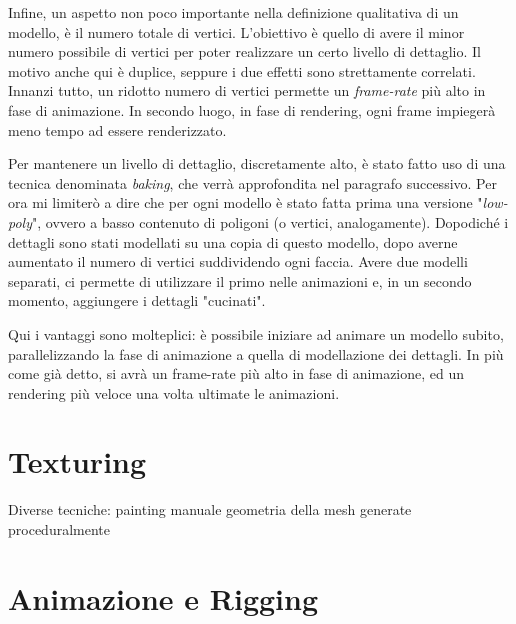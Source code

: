 Infine, un aspetto non poco importante nella definizione qualitativa di un modello, è il numero totale di vertici.
L'obiettivo è quello di avere il minor numero possibile di vertici per poter realizzare un certo livello di dettaglio.
Il motivo anche qui è duplice, seppure i due effetti sono strettamente correlati.
Innanzi tutto, un ridotto numero di vertici permette un \emph{frame-rate} più alto in fase di animazione.
In secondo luogo, in fase di rendering, ogni frame impiegerà meno tempo ad essere renderizzato.

Per mantenere un livello di dettaglio, discretamente alto, è stato fatto uso di una tecnica denominata \emph{baking}, che verrà approfondita nel paragrafo successivo.
Per ora mi limiterò a dire che per ogni modello è stato fatta prima una versione "\emph{low-poly}", ovvero a basso contenuto di poligoni (o vertici, analogamente).
Dopodiché i dettagli sono stati modellati su una copia di questo modello, dopo averne aumentato il numero di vertici suddividendo ogni faccia.
Avere due modelli separati, ci permette di utilizzare il primo nelle animazioni e, in un secondo momento, aggiungere i dettagli "cucinati".

Qui i vantaggi sono molteplici: è possibile iniziare ad animare un modello subito, parallelizzando la fase di animazione a quella di modellazione dei dettagli.
In più come già detto, si avrà un frame-rate più alto in fase di animazione, ed un rendering più veloce una volta ultimate le animazioni.

\section{Texturing}
Diverse tecniche:
painting manuale
geometria della mesh
generate proceduralmente

\section{Animazione e Rigging}

